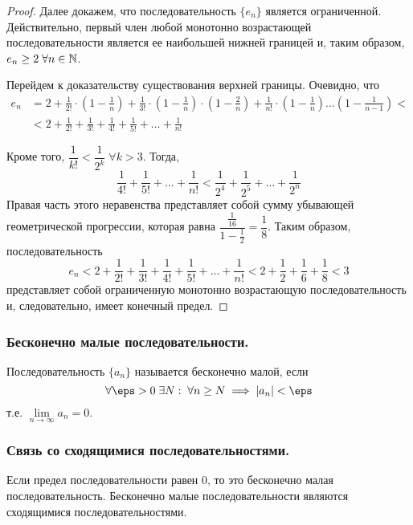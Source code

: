 \documentclass[12pt, a4paper]{article}
\begin{document}
\begin{proof}
		Далее докажем, что последовательность $\{e_n\}$ является ограниченной. Действительно, первый член любой монотонно возрастающей последовательности является ее наибольшей нижней границей и, таким образом, $e_n \geq 2 \; \forall n \in \mathbb{N}$.

		Перейдем к доказательству существования верхней границы. Очевидно, что
		\begin{align*}
			e_n 
			&= 2 + \frac{1}{2!} \cdot \left(1 - \frac{1}{n}\right) + \frac{1}{3!} \cdot \left(1 - \frac{1}{n}\right) \cdot \left(1 - \frac{2}{n}\right) + \frac{1}{n!} \cdot \left(1 - \frac{1}{n}\right) \dots \left(1 - \frac{1}{n - 1}\right) <\\
			&< 2 + \frac{1}{2!} + \frac{1}{3!} + \frac{1}{4!} + \frac{1}{5!} + \dots + \frac{1}{n!}
		\end{align*}

		Кроме того, $\dfrac{1}{k!} < \dfrac{1}{2^k} \; \forall k > 3$. Тогда,
		\begin{equation*}
			\frac{1}{4!} + \frac{1}{5!} + \dots + \frac{1}{n!} < 
			\frac{1}{2^4} + \frac{1}{2^5} + \dots + \frac{1}{2^n}
		\end{equation*}
		Правая часть этого неравенства представляет собой сумму убывающей геометрической прогрессии, которая равна $\dfrac{\frac{1}{16}}{1 - \frac{1}{2}} = \dfrac{1}{8}$. Таким образом, последовательность
		\begin{equation*}
			e_n < 2 + \frac{1}{2!} + \frac{1}{3!} + \frac{1}{4!} + \frac{1}{5!} + \dots + \frac{1}{n!}
			< 2 + \frac{1}{2} + \frac{1}{6} + \frac{1}{8} < 3
		\end{equation*}
		представляет собой ограниченную монотонно возрастающую последовательность и, следовательно, имеет конечный предел.
	\end{proof}

	\subsubsection{Бесконечно малые последовательности.}
	Последовательность $\{a_n\}$ называется бесконечно малой, если 
	\begin{equation*}
		\forall \eps > 0 \; \exists N: \; \forall n \geq N \implies |a_n| < \eps
	\end{equation*}
	т.е. $\lim\limits_{n \to \infty} a_n = 0$.

	\subsubsection{Связь со сходящимися последовательностями.}
	Если предел последовательности равен 0, то это бесконечно малая последовательность. Бесконечно малые последовательности являются сходящимися последовательностями.
\end{document}
